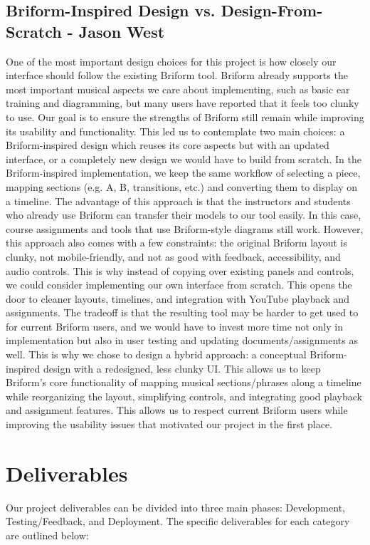 \documentclass[12pt, letterpaper]{article}
\begin{document}
\subsection*{Briform-Inspired Design vs. Design-From-Scratch - Jason West}
One of the most important design choices for this project is how closely our interface should follow the existing Briform tool. Briform already supports the most important musical aspects we care about implementing, such as basic ear training and diagramming, but many users have reported that it feels too clunky to use. Our goal is to ensure the strengths of Briform still remain while improving its usability and functionality. This led us to contemplate two main choices: a Briform-inspired design which reuses its core aspects but with an updated interface, or a completely new design we would have to build from scratch. In the Briform-inspired implementation, we keep the same workflow of selecting a piece, mapping sections (e.g. A, B, transitions, etc.) and converting them to display on a timeline. The advantage of this approach is that the instructors and students who already use Briform can transfer their models to our tool easily. In this case, course assignments and tools that use Briform-style diagrams still work. However, this approach also comes with a few constraints: the original Briform layout is clunky, not mobile-friendly, and not as good with feedback, accessibility, and audio controls. This is why instead of copying over existing panels and controls, we could consider implementing our own interface from scratch. This opens the door to cleaner layouts, timelines, and integration with YouTube playback and assignments. The tradeoff is that the resulting tool may be harder to get used to for current Briform users, and we would have to invest more time not only in implementation but also in user testing and updating documents/assignments as well. This is why we chose to design a hybrid approach: a conceptual Briform-inspired design with a redesigned, less clunky UI. This allows us to keep Briform's core functionality of mapping musical sections/phrases along a timeline while reorganizing the layout, simplifying controls, and integrating good playback and assignment features. This allows us to respect current Briform users while improving the usability issues that motivated our project in the first place.

\section*{Deliverables}
Our project deliverables can be divided into three main phases: Development, Testing/Feedback, and Deployment.  The specific deliverables for each category are outlined below:
\end{document}
